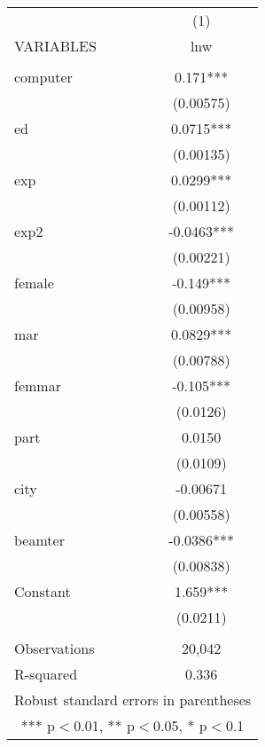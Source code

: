 \begin{tabular}{lc} \hline
 & (1) \\
VARIABLES & lnw \\ \hline
 &  \\
computer & 0.171*** \\
 & (0.00575) \\
ed & 0.0715*** \\
 & (0.00135) \\
exp & 0.0299*** \\
 & (0.00112) \\
exp2 & -0.0463*** \\
 & (0.00221) \\
female & -0.149*** \\
 & (0.00958) \\
mar & 0.0829*** \\
 & (0.00788) \\
femmar & -0.105*** \\
 & (0.0126) \\
part & 0.0150 \\
 & (0.0109) \\
city & -0.00671 \\
 & (0.00558) \\
beamter & -0.0386*** \\
 & (0.00838) \\
Constant & 1.659*** \\
 & (0.0211) \\
 &  \\
Observations & 20,042 \\
 R-squared & 0.336 \\ \hline
\multicolumn{2}{c}{ Robust standard errors in parentheses} \\
\multicolumn{2}{c}{ *** p$<$0.01, ** p$<$0.05, * p$<$0.1} \\
\end{tabular}
